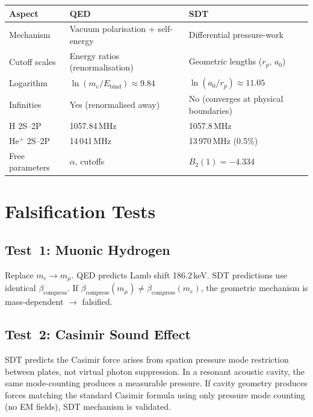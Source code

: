 \begin{center}
\begin{tabular}{lll}
\hline
\textbf{Aspect} & \textbf{QED} & \textbf{SDT} \\
\hline
Mechanism & Vacuum polarisation + self-energy & Differential pressure-work \\
Cutoff scales & Energy ratios (renormalisation) & Geometric lengths ($r_p$, $a_0$) \\
Logarithm & $\ln(m_e/E_{\text{bind}}) \approx 9.84$ & $\ln(a_0/r_p) \approx 11.05$ \\
Infinities & Yes (renormalised away) & No (converges at physical boundaries) \\
H 2S--2P & 1057.84\,MHz & 1057.8\,MHz \\
He$^+$ 2S--2P & 14\,041\,MHz & 13\,970\,MHz (0.5\%) \\
Free parameters & $\alpha$, cutoffs & $B_2(1) = -4.334$ \\
\hline
\end{tabular}
\end{center}


\section{Falsification Tests}

\subsection{Test~1: Muonic Hydrogen}

Replace $m_e \to m_\mu$.  QED predicts Lamb shift 186.2\,keV.  SDT predictions use identical $\beta_{\text{compress}}$.  If $\beta_{\text{compress}}(m_\mu) \neq \beta_{\text{compress}}(m_e)$, the geometric mechanism is mass-dependent $\to$ falsified.

\subsection{Test~2: Casimir Sound Effect}

SDT predicts the Casimir force arises from spation pressure mode restriction between plates, not virtual photon suppression.  In a resonant acoustic cavity, the same mode-counting produces a measurable pressure.  If cavity geometry produces forces matching the standard Casimir formula using only pressure mode counting (no EM fields), SDT mechanism is validated.

